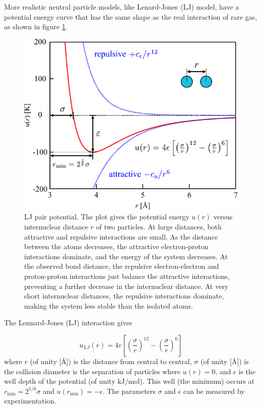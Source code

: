 More realistic neutral particle models, like Lenard-Jones (LJ) model,
have a potential energy curve that has the same shape as the real
interaction of rare gas, as shown in figure \ref{fig:LJ-pair-potential}.

\begin{figure}[h]
\begin{centering}
\includegraphics[scale=0.82]{_figure/lj-centre}
\par\end{centering}

\caption[LJ pair potential]{LJ pair potential. The plot gives the potential energy $u(r)$ versus
internuclear distance $r$ of two particles. At large distances, both
attractive and repulsive interactions are small. As the distance between
the atoms decreases, the attractive electron-proton interactions dominate,
and the energy of the system decreases. At the observed bond distance,
the repulsive electron-electron and proton-proton interactions just
balance the attractive interactions, preventing a further decrease
in the internuclear distance. At very short internuclear distances,
the repulsive interactions dominate, making the system less stable
than the isolated atoms.\label{fig:LJ-pair-potential}}
\end{figure}


The Lennard-Jones (LJ) interaction gives

\begin{equation}
u_{LJ}(r)=4\varepsilon\left[\left(\frac{\sigma}{r}\right)^{12}-\left(\frac{\sigma}{r}\right)^{6}\right]
\end{equation}
where $r$ (of unity {[}$\textrm{\AA}${]}) is the distance from central
to central, $\sigma$ (of unity {[}$\textrm{\AA}${]}) is the collision
diameter is the separation of particles where $u(r)=0$, and $\epsilon$
is the well depth of the potential (of unity $\mathrm{kJ/mol}$).
This well (the minimum) occurs at $r_{\min}=2^{1/6}\sigma$ and $u(r_{\min})=-\epsilon$.
The parameters $\sigma$ and $\epsilon$ can be measured by experimentation.

